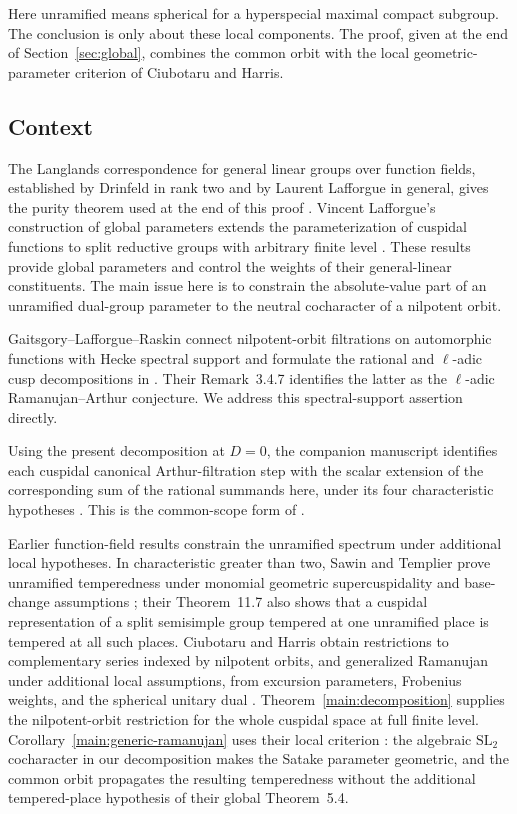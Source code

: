 Here unramified means spherical for a hyperspecial maximal compact
subgroup. The conclusion is only about these local components. The
proof, given at the end of Section~\ref{sec:global}, combines the common
orbit with the local geometric-parameter criterion of Ciubotaru and
Harris.

\subsection{Context}

The Langlands correspondence for general linear groups over function
fields, established by Drinfeld in rank two and by Laurent Lafforgue
in general, gives the purity theorem used at the end of this proof
\cite[Introduction and Theorem~VII.6]{LLafforgue}.
Vincent Lafforgue's construction of
global parameters extends the parameterization of cuspidal functions to
split reductive groups with arbitrary finite level
\cite[Theorem~1.1]{VLafforgue}. These results provide global parameters
and control the weights of their general-linear constituents. The main
issue here is to constrain the absolute-value part of an unramified
dual-group parameter to the neutral cocharacter of a nilpotent orbit.

Gaitsgory--Lafforgue--Raskin connect nilpotent-orbit filtrations on
automorphic functions with Hecke spectral support and formulate the
rational and \(\ell\)-adic cusp decompositions in
\cite[Section~3.4]{GLR}. Their Remark~3.4.7 identifies the latter as
the \(\ell\)-adic Ramanujan--Arthur conjecture. We address this
spectral-support assertion directly.

Using the present decomposition at \(D=0\), the companion manuscript
identifies each cuspidal canonical
Arthur-filtration step with the scalar extension of the corresponding sum
of the rational summands here, under its four characteristic hypotheses
\cite[Assumption~1.1 and Corollary~7.5]{ArthurRationality}. This is the
common-scope form of \cite[Conjectures~3.4.9 and~3.4.11]{GLR}.

Earlier function-field results constrain the unramified spectrum under
additional local hypotheses. In characteristic greater than two, Sawin and
Templier prove unramified temperedness under monomial geometric
supercuspidality and base-change assumptions
\cite[Theorem~1.1]{SawinTemplier}; their Theorem~11.7 also shows that a
cuspidal representation of a split semisimple group tempered at one
unramified place is tempered at all such places. Ciubotaru and Harris
obtain restrictions to complementary series indexed by nilpotent orbits,
and generalized Ramanujan under additional local assumptions, from
excursion parameters, Frobenius weights, and the spherical unitary dual
\cite[Theorems~1.11 and~5.4]{CiubotaruHarris}.
Theorem~\ref{main:decomposition} supplies the nilpotent-orbit restriction
for the whole cuspidal space at full finite level.
Corollary~\ref{main:generic-ramanujan} uses their local criterion
\cite[Corollary~6.32\textup{(1)}]{CiubotaruHarris}: the algebraic
\(\mathrm{SL}_2\) cocharacter in our decomposition makes the Satake
parameter geometric, and the
common orbit propagates the resulting temperedness without the additional
tempered-place hypothesis of their global Theorem~5.4.

